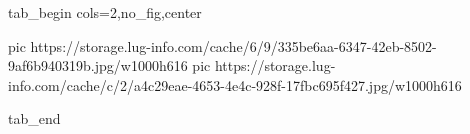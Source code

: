  
 
 
 
 


\ifcmt
  tab_begin cols=2,no_fig,center

     pic https://storage.lug-info.com/cache/6/9/335be6aa-6347-42eb-8502-9af6b940319b.jpg/w1000h616
		 pic https://storage.lug-info.com/cache/c/2/a4c29eae-4653-4e4c-928f-17fbc695f427.jpg/w1000h616

  tab_end
\fi
